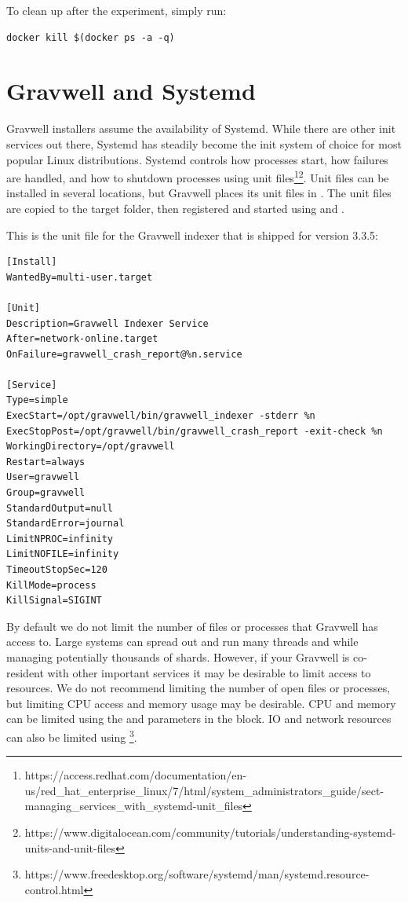 To clean up after the experiment, simply run:

\begin{Verbatim}[breaklines=true]
docker kill $(docker ps -a -q)
\end{Verbatim}



\section{Gravwell and Systemd}
{Gravwell installers assume the availability of Systemd. While there are
other init services out there, Systemd has steadily become the
init system of choice for most popular Linux distributions. Systemd
controls how processes start, how failures are handled, and how to
shutdown processes using unit
files\footnote{https://access.redhat.com/documentation/en-us/red\_hat\_enterprise\_linux/7/html/system\_administrators\_guide/sect-managing\_services\_with\_systemd-unit\_files}\footnote{https://www.digitalocean.com/community/tutorials/understanding-systemd-units-and-unit-files}.
Unit files can be installed in several locations, but Gravwell places
its unit files in . The unit files are copied
to the target folder, then registered and started using  and .

This is the unit file for the Gravwell indexer that is shipped for
version 3.3.5:

\begin{Verbatim}[breaklines=true]
[Install]
WantedBy=multi-user.target

[Unit]
Description=Gravwell Indexer Service
After=network-online.target
OnFailure=gravwell_crash_report@%n.service

[Service]
Type=simple
ExecStart=/opt/gravwell/bin/gravwell_indexer -stderr %n
ExecStopPost=/opt/gravwell/bin/gravwell_crash_report -exit-check %n
WorkingDirectory=/opt/gravwell
Restart=always
User=gravwell
Group=gravwell
StandardOutput=null
StandardError=journal
LimitNPROC=infinity
LimitNOFILE=infinity
TimeoutStopSec=120
KillMode=process
KillSignal=SIGINT
\end{Verbatim}

By default we do not limit the number of files or processes that
Gravwell has access to. Large systems can spread out and run many
threads and while managing potentially thousands of shards. However, if
your Gravwell is co-resident with other important services it may be
desirable to limit access to resources. We do not recommend limiting
the number of open files or processes, but limiting CPU access and
memory usage may be desirable. CPU and memory can be limited using the
 and  parameters in the
\code{[Service]} block. IO and network resources can also be limited
using
\footnote{https://www.freedesktop.org/software/systemd/man/systemd.resource-control.html}.


}

